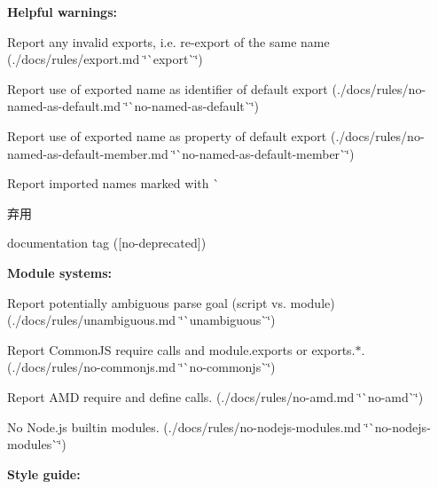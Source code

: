 {\bfseries Helpful warnings\+:}


\begin{DoxyItemize}
\item Report any invalid exports, i.\+e. re-\/export of the same name (./docs/rules/export.md \char`\"{}\`{}export\`{}\char`\"{})
\item Report use of exported name as identifier of default export (./docs/rules/no-\/named-\/as-\/default.md \char`\"{}\`{}no-\/named-\/as-\/default\`{}\char`\"{})
\item Report use of exported name as property of default export (./docs/rules/no-\/named-\/as-\/default-\/member.md \char`\"{}\`{}no-\/named-\/as-\/default-\/member\`{}\char`\"{})
\item Report imported names marked with \`{}\begin{DoxyRefDesc}{弃用}
\item[\mbox{\hyperlink{deprecated__deprecated000001}{弃用}}]{\ttfamily documentation tag (\mbox{[}}no-\/deprecated{\ttfamily \mbox{]})}\end{DoxyRefDesc}

\end{DoxyItemize}

{\bfseries Module systems\+:}


\begin{DoxyItemize}
\item Report potentially ambiguous parse goal ({\ttfamily script} vs. {\ttfamily module}) (./docs/rules/unambiguous.md \char`\"{}\`{}unambiguous\`{}\char`\"{})
\item Report Common\+JS {\ttfamily require} calls and {\ttfamily module.\+exports} or {\ttfamily exports.$\ast$}. (./docs/rules/no-\/commonjs.md \char`\"{}\`{}no-\/commonjs\`{}\char`\"{})
\item Report A\+MD {\ttfamily require} and {\ttfamily define} calls. (./docs/rules/no-\/amd.md \char`\"{}\`{}no-\/amd\`{}\char`\"{})
\item No Node.\+js builtin modules. (./docs/rules/no-\/nodejs-\/modules.md \char`\"{}\`{}no-\/nodejs-\/modules\`{}\char`\"{})
\end{DoxyItemize}

{\bfseries Style guide\+:}


